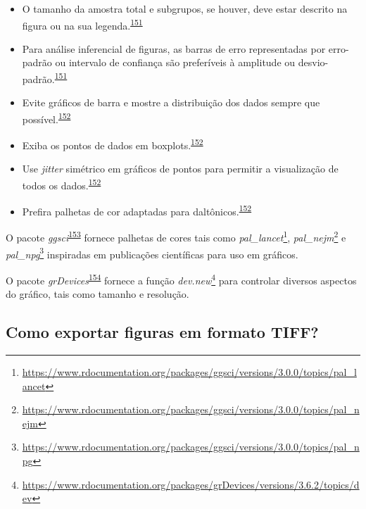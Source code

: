 \documentclass[
  a4paper,
]{book}
\renewcommand{\href}[2]{#2\footnote{\url{#1}}}
\newenvironment{infobox}[1]
  {
  \begin{itemize}
  \renewcommand{\labelitemi}{
    \raisebox{-.7\height}[0pt][0pt]{
      {\setkeys{Gin}{width=3em,keepaspectratio}
        \texttt{[image: \#1]}}
    }
  }
  \setlength{\fboxsep}{1em}
  \begin{blackbox}
  \item
  }
  {
  \end{blackbox}
  \end{itemize}
  }
\begin{document}
\begin{itemize}
\item
  O tamanho da amostra total e subgrupos, se houver, deve estar descrito na figura ou na sua legenda.\textsuperscript{\protect\hyperlink{ref-Cumming2007}{151}}
\item
  Para análise inferencial de figuras, as barras de erro representadas por erro-padrão ou intervalo de confiança são preferíveis à amplitude ou desvio-padrão.\textsuperscript{\protect\hyperlink{ref-Cumming2007}{151}}
\item
  Evite gráficos de barra e mostre a distribuição dos dados sempre que possível.\textsuperscript{\protect\hyperlink{ref-Weissgerber2019}{152}}
\item
  Exiba os pontos de dados em boxplots.\textsuperscript{\protect\hyperlink{ref-Weissgerber2019}{152}}
\item
  Use \emph{jitter} simétrico em gráficos de pontos para permitir a visualização de todos os dados.\textsuperscript{\protect\hyperlink{ref-Weissgerber2019}{152}}
\item
  Prefira palhetas de cor adaptadas para daltônicos.\textsuperscript{\protect\hyperlink{ref-Weissgerber2019}{152}}
\end{itemize}

\begin{infobox}{images/Rlogo}
O pacote \emph{ggsci}\textsuperscript{\protect\hyperlink{ref-ggsci}{153}} fornece palhetas de cores tais como \href{https://www.rdocumentation.org/packages/ggsci/versions/3.0.0/topics/pal_lancet}{\emph{pal\_lancet}}, \href{https://www.rdocumentation.org/packages/ggsci/versions/3.0.0/topics/pal_nejm}{\emph{pal\_nejm}} e \href{https://www.rdocumentation.org/packages/ggsci/versions/3.0.0/topics/pal_npg}{\emph{pal\_npg}} inspiradas em publicações científicas para uso em gráficos.

\end{infobox}

\begin{infobox}{images/Rlogo}
O pacote \emph{grDevices}\textsuperscript{\protect\hyperlink{ref-grDevices}{154}} fornece a função \href{https://www.rdocumentation.org/packages/grDevices/versions/3.6.2/topics/dev}{\emph{dev.new}} para controlar diversos aspectos do gráfico, tais como tamanho e resolução.

\end{infobox}

\hypertarget{como-exportar-figuras-em-formato-tiff}{%
\subsection{Como exportar figuras em formato TIFF?}\label{como-exportar-figuras-em-formato-tiff}}
\end{document}
